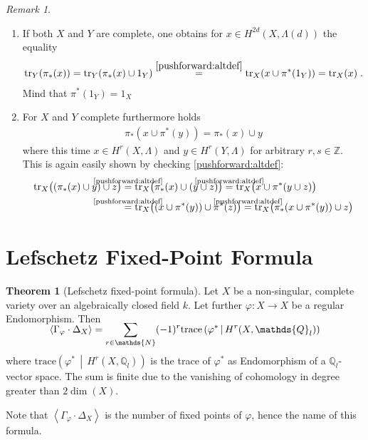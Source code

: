 \documentclass[english,headsepline=0.25pt]{scrartcl}
\theoremstyle{definition}
\newtheorem{Thm}[Def]{Theorem}
\theoremstyle{remark}
\newtheorem{Rem}[Def]{Remark}
\newcommand*{\N}{\mathds{N}}
\newcommand*{\Z}{\mathds{Z}}
\newcommand*{\Q}{\mathds{Q}}
\newcommand*{\Zl}{\Z_l} %
\newcommand*{\Ql}{\Q_l} %
\newcommand*{\Tr}{\text{tr}} %
\newcommand*{\intProd}[2]{{#1\cdot#2}} %
\newcommand*{\intNum}[1]{{\left\langle{#1}\right\rangle}} %
\newcommand*{\Graph}[1]{{\Gamma_{#1}}} %
\newcommand*{\Diag}[1]{{\Delta_{#1}}} %
\newcommand*{\trace}[2]{{\text{trace}\left(#1 \,\middle|\, #2 \right)}} %
\newcommand*{\one}[1]{{1_{#1}}}%
\renewcommand*{\phi}{\varphi}
\begin{document}
\begin{Rem}
\begin{enumerate}[label=(P\arabic*)]
  \item\label{pushforward:trace}
    If both $X$ and $Y$ are complete, one obtains for
    $x\in H^{2d}(X,\Lambda(d))$ the equality
    \begin{gather*}
      \Tr_Y(\pi_*(x))
      = \Tr_Y(\pi_*(x)\cup \one{Y})
      \overset{\ref{pushforward:altdef}}= \Tr_X(x\cup\pi^*(\one{Y}))
      = \Tr_X(x)
      \;.
    \end{gather*}
    Mind that $\pi^*(\one{Y})=\one{X}$
    \cite[compare][Rem.~V.11.6.]{milnebook} %
  \item
    For $X$ and $Y$ complete furthermore holds
    \begin{gather}
      \tag{Projection Formula}\label{pushforward:projectionformula}
      \pi_*(x\cup \pi^*(y)) = \pi_*(x)\cup y
    \end{gather}
    where this time $x\in H^r(X,\Lambda)$ and $y\in H^r(Y,\Lambda)$
    for arbitrary $r,s\in\Z$. This is again easily shown by checking
    \ref{pushforward:altdef}:
    \begin{align*}
      \Tr_X\big((\pi_*(x)\cup y) \cup z\big)
      &\overset{\mathclap{\text{\ref{pushforward:altdef}}}}=
      \Tr_X\big(\pi_*(x)\cup (y \cup z)\big)
      \overset{\mathclap{\text{\ref{pushforward:altdef}}}}=
      \Tr_X\big( x\cup \pi^*(y\cup z)\big)\\
      &\overset{\mathclap{\text{\ref{pushforward:altdef}}}}=
      \Tr_X\big( (x\cup \pi^*(y)) \cup \pi^*(z) \big)
      \overset{\mathclap{\text{\ref{pushforward:altdef}}}}=
      \Tr_X\big( \pi_*(x\cup \pi^*(y)) \cup z\big)
    \end{align*}
  \end{enumerate}
\end{Rem}

\section{Lefschetz Fixed-Point Formula}

\begin{Thm}[Lefschetz fixed-point formula]\label{lefschetzthm}
  Let $X$ be a non-singular, complete variety over an algebraically
  closed field $k$.
  Let further $\phi\colon X\to X$ be a regular Endomorphism.
  Then
  \begin{gather*}
    \SwapAboveDisplaySkip
    \intNum{\intProd{\Graph{\phi}}{\Diag{X}}}
    = \sum_{r\in\N} (-1)^r \trace{\phi^*}{H^r(X,\Ql)}
  \end{gather*}
  where $\trace{\phi^*}{H^r(X,\Ql)}$ is the trace of $\phi^*$ as
  Endomorphism of a $\Ql$-vector space. 
  The sum is finite due to the vanishing
  of cohomology in degree greater than $2\dim(X)$. 
\end{Thm}
Note that $\intNum{\intProd{\Graph{\phi}}{\Diag{X}}}$ is the number of
fixed points of $\phi$, hence the name of this formula.
\end{document}
